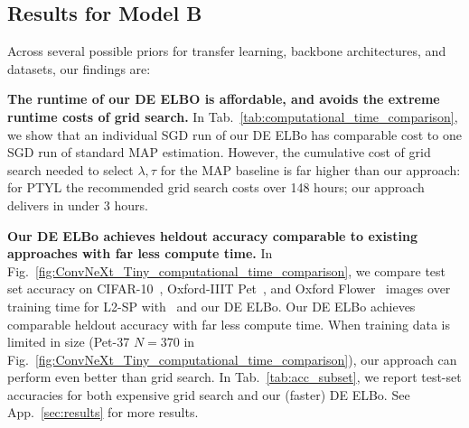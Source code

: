 \subsection{Results for Model B}

Across several possible priors for transfer learning, backbone architectures, and datasets, our findings are:

\textbf{The runtime of our DE ELBO is affordable, and avoids the extreme runtime costs of grid search.}
In Tab.~\ref{tab:computational_time_comparison}, we show that an individual SGD run of our DE ELBo has comparable cost to one SGD run of standard MAP estimation. However, the cumulative cost of grid search needed to select $\lambda,\tau$ for the MAP baseline is far higher than our approach: for PTYL the recommended grid search costs over 148 hours; our approach delivers in under 3 hours.

\textbf{Our DE ELBo achieves heldout accuracy comparable to existing approaches with far less compute time.}
In Fig.~\ref{fig:ConvNeXt_Tiny_computational_time_comparison}, we compare test set accuracy on CIFAR-10~\citep{krizhevsky2010cifar}, Oxford-IIIT Pet~\citep{parkhi2012cats}, and Oxford Flower~\citep{nilsback2008automated} images over training time for L2-SP with \baseline\ and our DE ELBo.
Our DE ELBo achieves comparable heldout accuracy with far less compute time.
When training data is limited in size (Pet-37 $N=370$ in Fig.~\ref{fig:ConvNeXt_Tiny_computational_time_comparison}), our approach can perform even better than grid search.
In Tab.~\ref{tab:acc_subset}, we report test-set accuracies for both expensive grid search and our (faster) DE ELBo. See App.~\ref{sec:results} for more results.